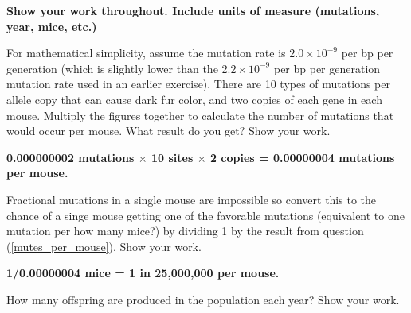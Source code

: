 \documentclass[11pt, hidelinks, addpoints]{exam}
\begin{document}
\textbf{Show your work throughout. Include units of measure (mutations, year, mice, etc.)}
\begin{questions}

\question[1]
\label{mutes_per_mouse}For mathematical simplicity, assume the mutation rate is $2.0
\times 10^{-9}$ per bp per generation (which is slightly lower
than the $2.2 \times 10^{-9}$ per bp per generation mutation
rate used in an earlier exercise). There are 10 types of mutations per
allele copy that can cause dark fur color, and two copies of each gene
in each mouse. Multiply the figures together to calculate the number of
mutations that would occur per mouse. What result do you get? Show your work.

\ifprintanswers\vspace{\baselineskip}
	\textbf{0.000000002 mutations $\times$ 10 sites $\times$ 2 copies = 0.00000004 mutations per mouse.}
\else
\fi

\question[1]
\label{how_many_mice}Fractional mutations in a single mouse are impossible so
convert this to the chance of a singe mouse getting one of the favorable
mutations (equivalent to one mutation per how many mice?) by dividing 1
by the result from question (\ref{mutes_per_mouse}). Show your work.

\ifprintanswers\vspace{\baselineskip}
	\textbf{1/0.00000004 mice = 1 in 25,000,000 per mouse.}
\else
\fi

\newpage

\question[1]
\label{how_many_offspring}How many offspring are produced in the population each year? Show your work.


\end{questions}
\end{document}
